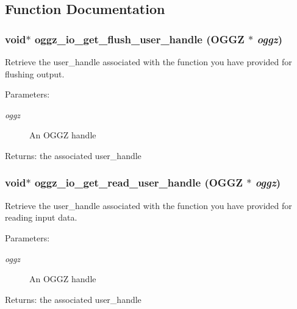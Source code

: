 \subsection{Function Documentation}
\subsubsection{\setlength{\rightskip}{0pt plus 5cm}void$\ast$ oggz\_\-io\_\-get\_\-flush\_\-user\_\-handle ({\bf OGGZ} $\ast$ {\em oggz})}\label{oggz__io_8h_a14}


Retrieve the user\_\-handle associated with the function you have provided for flushing output. 

\begin{Desc}
\item[Parameters:]
\begin{description}
\item[{\em oggz}]An OGGZ handle \end{description}
\end{Desc}
\begin{Desc}
\item[Returns:]the associated user\_\-handle \end{Desc}
\subsubsection{\setlength{\rightskip}{0pt plus 5cm}void$\ast$ oggz\_\-io\_\-get\_\-read\_\-user\_\-handle ({\bf OGGZ} $\ast$ {\em oggz})}\label{oggz__io_8h_a6}


Retrieve the user\_\-handle associated with the function you have provided for reading input data. 

\begin{Desc}
\item[Parameters:]
\begin{description}
\item[{\em oggz}]An OGGZ handle \end{description}
\end{Desc}
\begin{Desc}
\item[Returns:]the associated user\_\-handle \end{Desc}
